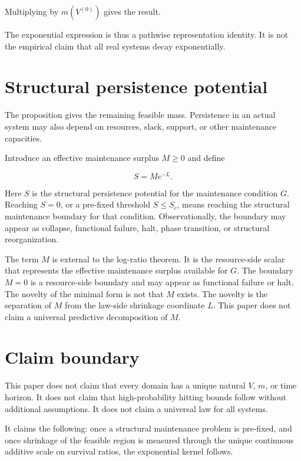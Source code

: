 \documentclass[12pt,a4paper]{article}
\begin{document}
Multiplying by \(m(V^{(0)})\) gives the result.

The exponential expression is thus a pathwise representation identity. It is not the empirical claim that all real systems decay exponentially.

\section{Structural persistence potential}\label{structural-persistence-potential}

The proposition gives the remaining feasible mass. Persistence in an actual system may also depend on resources, slack, support, or other maintenance capacities.

Introduce an effective maintenance surplus \(M\ge 0\) and define

\[
S=Me^{-L}.
\]

Here \(S\) is the structural persistence potential for the maintenance condition \(G\). Reaching \(S=0\), or a pre-fixed threshold \(S\le S_{c}\), means reaching the structural maintenance boundary for that condition. Observationally, the boundary may appear as collapse, functional failure, halt, phase transition, or structural reorganization.

The term \(M\) is external to the log-ratio theorem. It is the resource-side scalar that represents the effective maintenance surplus available for \(G\). The boundary \(M=0\) is a resource-side boundary and may appear as functional failure or halt. The novelty of the minimal form is not that \(M\) exists. The novelty is the separation of \(M\) from the law-side shrinkage coordinate \(L\). This paper does not claim a universal predictive decomposition of \(M\).

\section{Claim boundary}\label{claim-boundary}

This paper does not claim that every domain has a unique natural \(V\), \(m\), or time horizon. It does not claim that high-probability hitting bounds follow without additional assumptions. It does not claim a universal law for all systems.

It claims the following: once a structural maintenance problem is pre-fixed, and once shrinkage of the feasible region is measured through the unique continuous additive scale on survival ratios, the exponential kernel follows.
\end{document}
